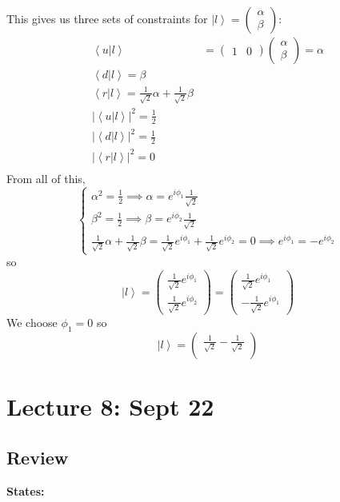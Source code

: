\documentclass[12pt]{article}
\newcommand{\brak}[1]{\left\langle #1 \right\rangle}
\newcommand{\ket}[1]{\left\vert #1 \right\rangle}
\begin{document}
This gives us three sets of constraints for $\ket{l} = \begin{pmatrix}
    \alpha\\\beta
\end{pmatrix}$:
\begin{align*}
    \brak{u|l} &= \begin{pmatrix}
        1 & 0
    \end{pmatrix}\begin{pmatrix}
        \alpha\\\beta
    \end{pmatrix} = \alpha\\
    \brak{d | l} = \beta\\
    \brak{r | l} = \frac{1}{\sqrt 2} \alpha + \frac{1}{\sqrt 2} \beta\\
    |\brak{u|l}|^2 = \frac{1}{2}\\
    |\brak{d|l}|^2 = \frac{1}{2}\\
    |\brak{r|l}|^2 = 0\\
\end{align*}
From all of this, 
\[\begin{cases}
    \alpha^2 = \frac{1}{2} \implies \alpha = e^{i\phi_1} \frac{1}{\sqrt 2}\\
    \beta^2 = \frac{1}{2} \implies \beta = e^{i\phi_2} \frac{1}{\sqrt 2}\\
    \frac{1}{\sqrt 2} \alpha + \frac{1}{\sqrt 2} \beta = \frac{1}{\sqrt 2}e^{i\phi_1} + \frac{1}{\sqrt 2}e^{i\phi_2} = 0 \implies e^{i\phi_1} = -e^{i\phi_2}
\end{cases}\]
so 
\[\ket{l} = \begin{pmatrix}
    \frac{1}{\sqrt 2} e^{i\phi_1}\\
    \frac{1}{\sqrt 2} e^{i\phi_2}
\end{pmatrix} = \begin{pmatrix}
    \frac{1}{\sqrt 2} e^{i\phi_1}\\
    -\frac{1}{\sqrt 2} e^{i\phi_1} 
\end{pmatrix}\]
We choose $\phi_1 = 0$ so 
\[\ket{l} = \begin{pmatrix}
    \frac{1}{\sqrt 2}
    -\frac{1}{\sqrt 2}\\
\end{pmatrix}\]

\section*{Lecture 8: Sept 22}
\subsection*{Review}
\textbf{States:}
\end{document}
